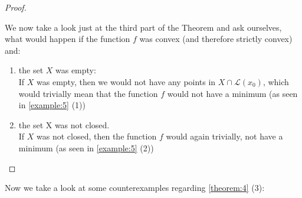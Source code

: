 \documentclass[a4paper, 11pt]{report}
\theoremstyle{break}
\theoremstyle{proofstyle}
\newtheorem{proof}{Proof}
\begin{document}
\begin{proof}
\begin{enumerate}[label=(\arabic*)]
		We now take a look just at the third part of the Theorem and ask ourselves, what would happen if the function $f$ was convex (and therefore strictly convex) and: 
		\begin{enumerate}
			\item the set $X$ was empty: \\
			If $X$ was empty, then we would not have any points in $X \cap \mathcal{L}(x_0)$, which would trivially mean that the function $f$ would not have a minimum (as seen in \cref{example:5} (1))
			\item the set X was not closed. \\
			If $X$ was not closed, then the function $f$ would again trivially, not have a minimum (as seen in \cref{example:5} (2))
		\end{enumerate}
	\end{enumerate}
\end{proof}

Now we take a look at some counterexamples regarding \cref{theorem:4} (3): 
    
\end{document}
